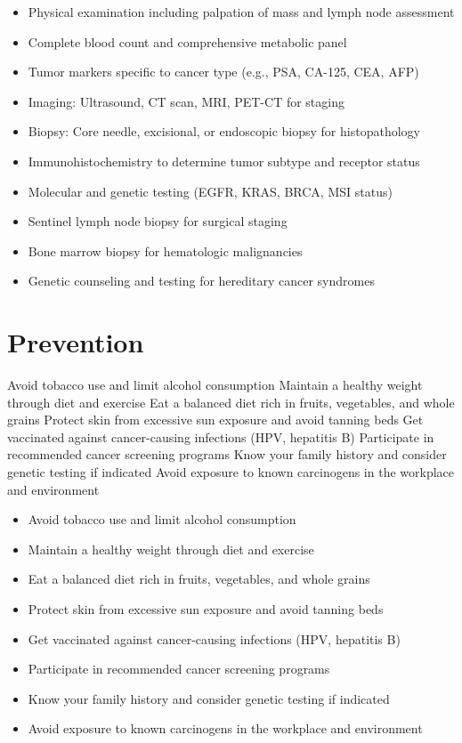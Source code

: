 \begin{itemize}[noitemsep]
  \item Physical examination including palpation of mass and lymph node assessment
  \item Complete blood count and comprehensive metabolic panel
  \item Tumor markers specific to cancer type (e.g., PSA, CA-125, CEA, AFP)
  \item Imaging: Ultrasound, CT scan, MRI, PET-CT for staging
  \item Biopsy: Core needle, excisional, or endoscopic biopsy for histopathology
  \item Immunohistochemistry to determine tumor subtype and receptor status
  \item Molecular and genetic testing (EGFR, KRAS, BRCA, MSI status)
  \item Sentinel lymph node biopsy for surgical staging
  \item Bone marrow biopsy for hematologic malignancies
  \item Genetic counseling and testing for hereditary cancer syndromes
\end{itemize}
\section{Prevention}
Avoid tobacco use and limit alcohol consumption Maintain a healthy weight through diet and exercise Eat a balanced diet rich in fruits, vegetables, and whole grains Protect skin from excessive sun exposure and avoid tanning beds Get vaccinated against cancer-causing infections (HPV, hepatitis B) Participate in recommended cancer screening programs Know your family history and consider genetic testing if indicated Avoid exposure to known carcinogens in the workplace and environment

\begin{itemize}[noitemsep]
  \item Avoid tobacco use and limit alcohol consumption
  \item Maintain a healthy weight through diet and exercise
  \item Eat a balanced diet rich in fruits, vegetables, and whole grains
  \item Protect skin from excessive sun exposure and avoid tanning beds
  \item Get vaccinated against cancer-causing infections (HPV, hepatitis B)
  \item Participate in recommended cancer screening programs
  \item Know your family history and consider genetic testing if indicated
  \item Avoid exposure to known carcinogens in the workplace and environment
\end{itemize}
